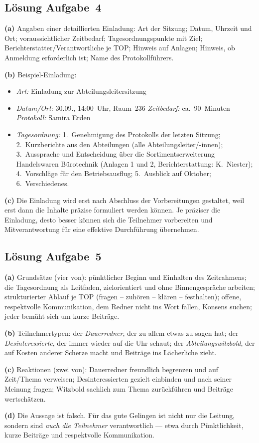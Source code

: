 \documentclass[11pt, a4paper]{article}
\begin{document}
\subsection*{Lösung Aufgabe~4}
\begin{loesung}
\textbf{(a)} Angaben einer detaillierten Einladung: Art der Sitzung; Datum, Uhrzeit und Ort;
voraussichtlicher Zeitbedarf; Tagesordnungspunkte mit Ziel; Berichterstatter/Verantwortliche
je TOP; Hinweis auf Anlagen; Hinweis, ob Anmeldung erforderlich ist; Name des
Protokollführers.

\textbf{(b)} Beispiel-Einladung:
\begin{itemize}[itemsep=0pt]
  \item \emph{Art:} Einladung zur Abteilungsleitersitzung
  \item \emph{Datum/Ort:} 30.09., 14:00~Uhr, Raum~236 \textbar{} \emph{Zeitbedarf:} ca.\ 90~Minuten \textbar{} \emph{Protokoll:} Samira Erden
  \item \emph{Tagesordnung:} 1.\ Genehmigung des Protokolls der letzten Sitzung; 2.\ Kurzberichte aus den Abteilungen (alle Abteilungsleiter/-innen); 3.\ Aussprache und Entscheidung über die Sortimentserweiterung Handelswaren Bürotechnik (Anlagen 1 und 2, Berichterstattung: K.\ Niester); 4.\ Vorschläge für den Betriebsausflug; 5.\ Ausblick auf Oktober; 6.\ Verschiedenes.
\end{itemize}

\textbf{(c)} Die Einladung wird erst nach Abschluss der Vorbereitungen gestaltet, weil erst
dann die Inhalte präzise formuliert werden können. Je präziser die Einladung, desto besser
können sich die Teilnehmer vorbereiten und Mitverantwortung für eine effektive Durchführung
übernehmen.
\end{loesung}

\subsection*{Lösung Aufgabe~5}
\begin{loesung}
\textbf{(a)} Grundsätze (vier von): pünktlicher Beginn und Einhalten des Zeitrahmens; die
Tagesordnung als Leitfaden, zielorientiert und ohne Binnengespräche arbeiten; strukturierter
Ablauf je TOP (fragen -- zuhören -- klären -- festhalten); offene, respektvolle Kommunikation,
dem Redner nicht ins Wort fallen, Konsens suchen; jeder bemüht sich um kurze Beiträge.

\textbf{(b)} Teilnehmertypen: der \emph{Dauerredner}, der zu allem etwas zu sagen hat; der
\emph{Desinteressierte}, der immer wieder auf die Uhr schaut; der \emph{Abteilungswitzbold},
der auf Kosten anderer Scherze macht und Beiträge ins Lächerliche zieht.

\textbf{(c)} Reaktionen (zwei von): Dauerredner freundlich begrenzen und auf Zeit/Thema
verweisen; Desinteressierten gezielt einbinden und nach seiner Meinung fragen; Witzbold
sachlich zum Thema zurückführen und Beiträge wertschätzen.

\textbf{(d)} Die Aussage ist falsch. Für das gute Gelingen ist nicht nur die Leitung,
sondern sind \emph{auch die Teilnehmer} verantwortlich --- etwa durch Pünktlichkeit, kurze
Beiträge und respektvolle Kommunikation.
\end{loesung}
\end{document}
